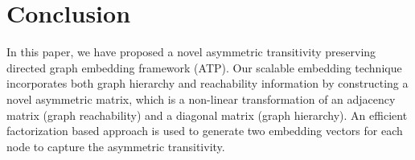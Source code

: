 \documentclass[letterpaper]{article} \usepackage{aaai19}  \usepackage{times}  \usepackage{helvet}  \usepackage{courier}  \usepackage{url}  \usepackage{graphicx}  \usepackage{booktabs} \usepackage{xcolor}
\begin{document}
\begin{comment}
\begin{figure*}
        \centering
        \begin{subfigure}[b]{0.48\textwidth}
            \centering
            \texttt{[image: pics/ATP\_ColdQuestion\_Routing\_MRR\_EGA]}
            \caption[MRR]{{\small MRR}}    
            \label{fig:mean and std of net14}
        \end{subfigure}
        \hfill
        \begin{subfigure}[b]{0.48\textwidth}  
            \centering 
            \texttt{[image: pics/ATP\_ColdQuestion\_Routing\_Accuracy\_EGA]}
            \caption[]{{\small Accuracy}}    
            \label{fig:mean and std of net24}
        \end{subfigure}
        \vskip\baselineskip
        \begin{subfigure}[b]{0.48\textwidth}   
            \centering 
            \texttt{[image: pics/ATP\_ColdQuestion\_Routing\_P1\_EGA]}
            \caption[]{{\small Precision1}}    
            \label{fig:mean and std of net34}
        \end{subfigure}
        \quad
        \begin{subfigure}[b]{0.48\textwidth}   
            \centering 
            \texttt{[image: pics/ATP\_ColdQuestion\_Routing\_P3\_EGA]}
            \caption[]{{\small Precision3}}    
            \label{fig:mean and std of net44}
        \end{subfigure}
        \caption[]
        {\small Cold Question Routing Performance of ATP on Competition Graphs w/wo EGA} 
        \label{fig:ATP_EGA_ColdStart_ExistingAsker}
\end{figure*}
\end{comment}



\section{Conclusion}
\label{sec:conclusion}

In this paper, we have proposed a novel asymmetric transitivity preserving directed graph embedding framework (ATP).
Our scalable embedding technique incorporates both graph hierarchy and reachability information by constructing a novel asymmetric matrix, which is a non-linear transformation of an adjacency matrix (graph reachability) and a diagonal matrix (graph hierarchy).
An efficient factorization based approach is used to generate two embedding vectors for each node to capture the asymmetric transitivity.
\end{document}

